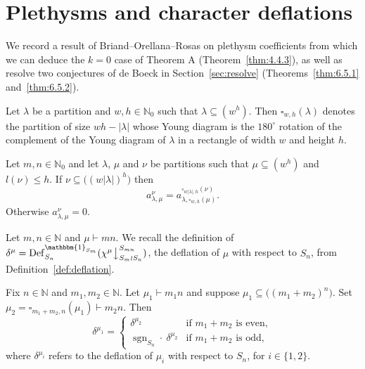\documentclass[ALCO, Unicode]{cedram}
\newcommand{\triv}{\mathbbm{1}}
\newcommand{\sgn}{\operatorname{sgn}}
\newcommand{\down}{\big\downarrow}
\newcommand{\N}{\mathbb{N}}
\begin{document}
\section{Plethysms and character deflations}\label{sec:pre-recursive-formula}
We record a result of Briand--Orellana--Rosas on plethysm coefficients from which we can deduce the $k=0$ case of Theorem A (Theorem~\ref{thm:4.4.3}), as well as resolve two conjectures of de Boeck in Section~\ref{sec:resolve} (Theorems~\ref{thm:6.5.1} and~\ref{thm:6.5.2}).

\begin{definition}
	Let $\lambda$ be a partition and $w,h\in\N_0$ such that $\lambda\subseteq (w^h)$. Then $\square_{w,h}(\lambda)$ denotes the partition of size $wh-|\lambda|$ whose Young diagram is the $180^\circ$ rotation of the complement of the Young diagram of $\lambda$ in a rectangle of width $w$ and height $h$.
\end{definition}

\begin{theorem}\label{thm:BOR}
	Let $m,n\in\N_0$ and let $\lambda$, $\mu$ and $\nu$ be partitions such that $\mu\subseteq(w^h)$ and $l(\nu)\le h$. If $\nu\subseteq \big((w|\lambda|)^h\big)$ then
	\[ a^\nu_{\lambda,\mu} = a^{\square_{w|\lambda|,h}(\nu)}_{\lambda,\square_{w,h}(\mu)}. \]
	Otherwise $a^\nu_{\lambda,\mu}=0$.
\end{theorem}

Let $m,n\in\N$ and $\mu\vdash mn$. We recall the definition of $\delta^\mu=\operatorname{Def}^{\triv_{S_m}}_{S_n}(\chi^\mu\down^{S_{mn}}_{S_m\wr S_n})$, the deflation of $\mu$ with respect to $S_n$, from Definition~\ref{def:deflation}.
\begin{proposition}\label{prop:12.4}
	Fix $n\in\N$ and $m_1,m_2\in\N$. Let $\mu_1\vdash m_1n$ and suppose $\mu_1\subseteq \big((m_1+m_2)^n\big)$. Set $\mu_2=\square_{m_1+m_2,n}(\mu_1)\vdash m_2n$. Then
	\[ \delta^{\mu_1} = \begin{cases}
		\delta^{\mu_2} & \text{if }m_1+m_2\text{ is even},\\
		\sgn_{S_n}\cdot\ \delta^{\mu_2} & \text{if }m_1+m_2\text{ is odd},
	\end{cases}
	\]
	where $\delta^{\mu_i}$ refers to the deflation of $\mu_i$ with respect to $S_n$, for $i\in\{1,2\}$.
\end{proposition}
\end{document}
